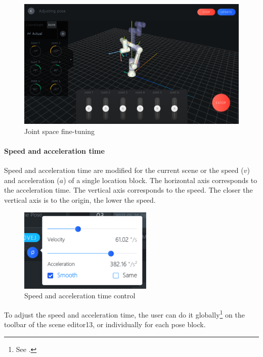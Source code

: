 \begin{figure}[ht]
	\centering
	\includegraphics[width=\textwidth]{en/image/joints.png}
	\caption{Joint space fine-tuning}
	\label{fig:关节空间微调}
\end{figure}

\paragraph{Speed and acceleration time}
Speed and acceleration time are modified for the current scene or the speed ($v$) and acceleration ($a$) of a single location block. The horizontal axis corresponds to the acceleration time. The vertical axis corresponds to the speed. The closer the vertical axis is to the origin, the lower the speed.

\begin{figure}[ht]
	\centering
	\includegraphics[height=4cm]{en/image/3-11.png}
	\caption{Speed and acceleration time control}
	\label{fig:速度控件}
\end{figure}

To adjust the speed and acceleration time, the user can do it globally\footnote{See .} on the toolbar of the scene editor13, or individually for each pose block.


